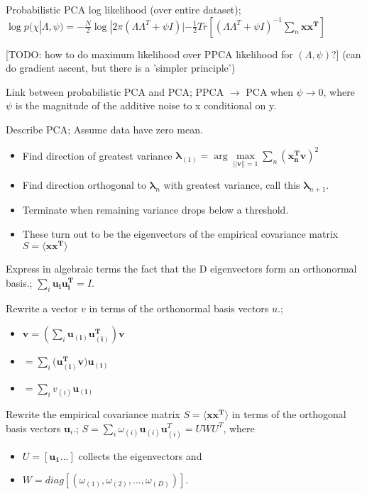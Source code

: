 \documentclass{article}
\begin{document}
Probabilistic PCA log likelihood (over entire dataset); $\log p(\chi | \Lambda, \psi) = -\frac{N}{2}\log|2\pi(\Lambda\Lambda^T+\psi I)|-\frac{1}{2}Tr[(\Lambda\Lambda^T+\psi I)^{-1}\sum_n\mathbf{x x^T}]$

[TODO: how to do maximum likelihood over PPCA likelihood for $(\Lambda, \psi)$?] (can do gradient ascent, but there is a 'simpler principle')

Link between probabilistic PCA and PCA; PPCA $\to$ PCA when $\psi\to 0$, where $\psi$ is the magnitude of the additive noise to x conditional on y.

Describe PCA; Assume data have zero mean. \begin{itemize} \item Find direction of greatest variance $\mathbf{\lambda}_{(1)}=\arg\max\limits_{||\mathbf{v}||=1}\sum_n(\mathbf{x^T_nv})^2$ \item Find direction orthogonal to $\mathbf{\lambda}_{n}$ with greatest variance, call this  $\mathbf{\lambda}_{n+1}$.  \item Terminate when remaining variance drops below a threshold.  \item These turn out to be the eigenvectors of the empirical covariance matrix $S=\langle \mathbf{xx^T} \rangle$ \end{itemize}

Express in algebraic terms the fact that the D eigenvectors form an orthonormal basis.; $\sum_i\mathbf{u_{i}u_{i}^T}=I$.

Rewrite a vector $v$ in terms of the orthonormal basis vectors $u$.; \begin{itemize} \item $\mathbf{v}=(\sum_i \mathbf{u_{(i)}u_{(i)}^T})\mathbf{v}$ \item $=\sum_i (\mathbf{u_{(i)}^Tv)u_{(i)}}$ \item $=\sum_i v_{(i)}\mathbf{u_{(i)}}$ \end{itemize}

Rewrite the empirical covariance matrix $S=\langle \mathbf{xx^T} \rangle$ in terms of the orthogonal basis vectors $\mathbf{u}_i$.; $S=\sum_i \omega_{(i)}\mathbf{u}_{(i)}\mathbf{u}_{(i)}^T = UWU^T$, where \begin{itemize} \item $U=[\mathbf{u_{1}}...]$ collects the eigenvectors and \item $W = diag[(\omega_{(1)}, \omega_{(2)},...,\omega_{(D)})]$.  \end{itemize}
\end{document}
